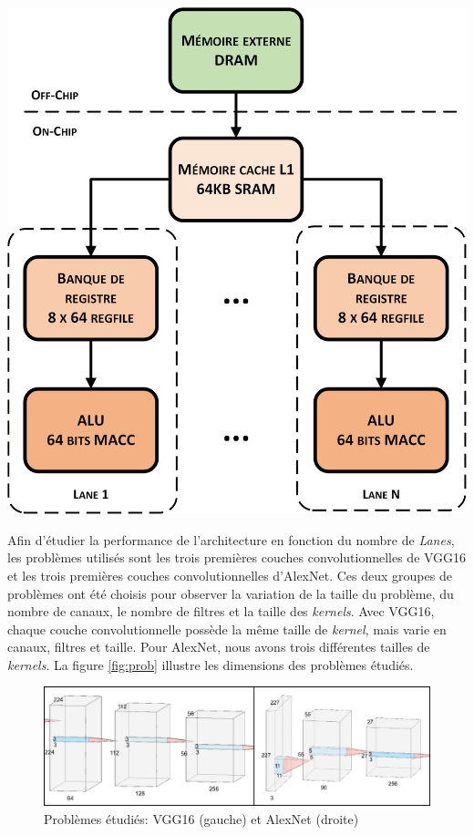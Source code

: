 \documentclass[10pt,letterpaper]{article}
\begin{document}
\begin{multicols}{2}
    {\centering
    \includegraphics[width=0.8\linewidth]{arch_visio.png}
    \captionsetup{hypcap=false}
    \label{fig:timeloop_arch}}
    \bigskip

    Afin d'étudier la performance de l'architecture en fonction du nombre de \textit{Lanes}, 
    les problèmes utilisés sont les trois premières couches convolutionnelles de VGG16 et 
    les trois premières couches convolutionnelles d'AlexNet. Ces deux groupes de problèmes 
    ont été choisis pour observer la variation de la taille du problème, du nombre de canaux, 
    le nombre de filtres et la taille des \textit{kernels}. Avec VGG16, chaque couche convolutionnelle 
    possède la même taille de \textit{kernel}, mais varie en canaux, filtres et taille. Pour 
    AlexNet, nous avons trois différentes tailles de \textit{kernels}. La figure \ref{fig:prob} 
    illustre les dimensions des problèmes étudiés.
    
    \begin{figure}[H]
        \centering
        \includegraphics[width=\linewidth]{probs.png}
        \caption{Problèmes étudiés: VGG16 (gauche) et AlexNet (droite)}
        \label{fig:probs}
    \end{figure}


\end{multicols}
\end{document}
